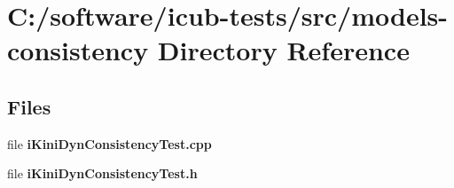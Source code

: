 \section{C\+:/software/icub-\/tests/src/models-\/consistency Directory Reference}
\label{dir_6355ee7e8e7fccbf90712e6e68524328}
\subsection*{Files}
\begin{DoxyCompactItemize}
\item 
file {\bfseries i\+Kini\+Dyn\+Consistency\+Test.\+cpp}
\item 
file {\bfseries i\+Kini\+Dyn\+Consistency\+Test.\+h}
\end{DoxyCompactItemize}
